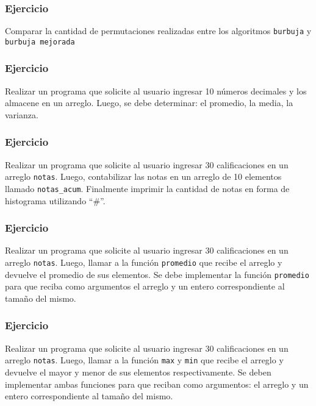 \subsubsection{Ejercicio}
Comparar la cantidad de permutaciones realizadas entre los algoritmos \texttt{burbuja} y \texttt{burbuja mejorada}

\subsubsection{Ejercicio}
Realizar un programa que solicite al usuario ingresar 10 números decimales y los almacene en un arreglo. Luego, se debe determinar: el promedio, la media, la varianza.

\subsubsection{Ejercicio}
Realizar un programa que solicite al usuario ingresar 30 calificaciones en un arreglo \texttt{notas}. Luego, contabilizar las notas en un arreglo de 10 elementos llamado \texttt{notas\_acum}. Finalmente imprimir la cantidad de notas en forma de histograma utilizando ``\#''.

\subsubsection{Ejercicio}
Realizar un programa que solicite al usuario ingresar 30 calificaciones en un arreglo \texttt{notas}. Luego, llamar a la función \texttt{promedio} que recibe el arreglo y devuelve el promedio de sus elementos. Se debe implementar la función \texttt{promedio} para que reciba como argumentos el arreglo y un entero correspondiente al tamaño del mismo.

\subsubsection{Ejercicio}
Realizar un programa que solicite al usuario ingresar 30 calificaciones en un arreglo \texttt{notas}. Luego, llamar a la función \texttt{max} y \texttt{min} que recibe el arreglo y devuelve el mayor y menor de sus elementos respectivamente. Se deben implementar ambas funciones para que reciban como argumentos: el arreglo y un entero correspondiente al tamaño del mismo.

